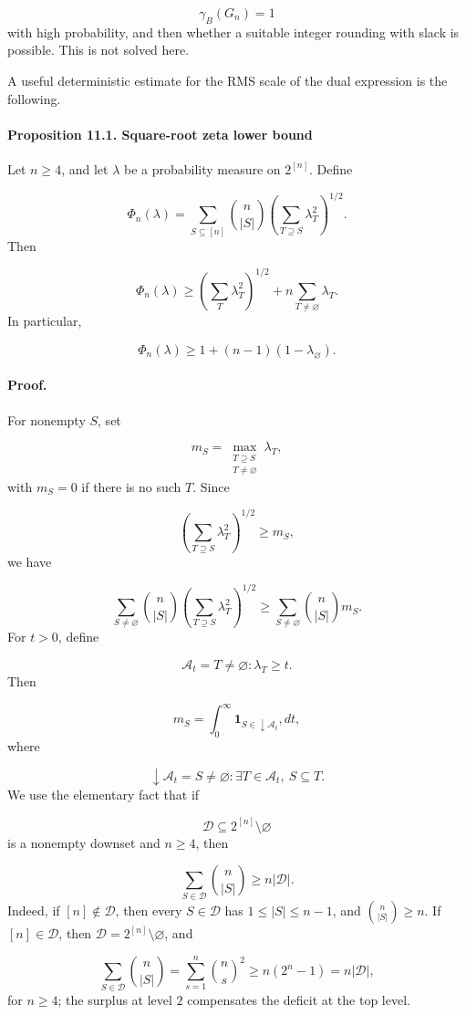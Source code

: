 \documentclass[11pt]{article}
\theoremstyle{definition}
\begin{document}
\[
\gamma_B(G_n)=1
\]
with high probability, and then whether a suitable integer rounding with slack is possible. This is not solved here.

A useful deterministic estimate for the RMS scale of the dual expression is the following.

\paragraph{Proposition 11.1. Square-root zeta lower bound}
Let $n\ge4$, and let $\lambda$ be a probability measure on $2^{[n]}$. Define

\[
\Phi_n(\lambda)
=
\sum_{S\subseteq[n]}
\binom n{|S|}
\left(
\sum_{T\supseteq S}\lambda_T^2
\right)^{1/2}.
\]
Then

\[
\Phi_n(\lambda)
\ge
\left(\sum_T\lambda_T^2\right)^{1/2}
+
n\sum_{T\ne\varnothing}\lambda_T.
\]
In particular,

\[
\Phi_n(\lambda)
\ge
1+(n-1)(1-\lambda_\varnothing).
\]
\paragraph{Proof.}
For nonempty $S$, set

\[
m_S=
\max_{\substack{T\supseteq S\\ T\ne\varnothing}}\lambda_T,
\]
with $m_S=0$ if there is no such $T$. Since

\[
\left(
\sum_{T\supseteq S}\lambda_T^2
\right)^{1/2}
\ge m_S,
\]
we have

\[
\sum_{S\ne\varnothing}
\binom n{|S|}
\left(
\sum_{T\supseteq S}\lambda_T^2
\right)^{1/2}
\ge
\sum_{S\ne\varnothing}
\binom n{|S|}m_S.
\]
For $t>0$, define

\[
\mathcal A_t={T\ne\varnothing:\lambda_T\ge t}.
\]
Then

\[
m_S=
\int_0^\infty
\mathbf 1_{{S\in\downarrow\mathcal A_t}},dt,
\]
where

\[
\downarrow\mathcal A_t
=
{S\ne\varnothing:\exists T\in\mathcal A_t,\ S\subseteq T}.
\]
We use the elementary fact that if

\[
\mathcal D\subseteq2^{[n]}\setminus{\varnothing}
\]
is a nonempty downset and $n\ge4$, then

\[
\sum_{S\in\mathcal D}\binom n{|S|}
\ge n|\mathcal D|.
\]
Indeed, if $[n]\notin\mathcal D$, then every $S\in\mathcal D$ has $1\le |S|\le n-1$, and $\binom n{|S|}\ge n$. If $[n]\in\mathcal D$, then $\mathcal D=2^{[n]}\setminus{\varnothing}$, and

\[
\sum_{S\in\mathcal D}\binom n{|S|}
=
\sum_{s=1}^n\binom ns^2
\ge
n(2^n-1)
=
n|\mathcal D|,
\]
for $n\ge4$; the surplus at level $2$ compensates the deficit at the top level.
\end{document}
